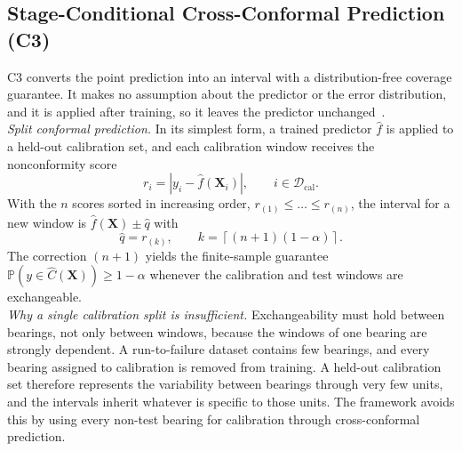 \subsection{Stage-Conditional Cross-Conformal Prediction (C3)}
\label{sec:c3_conformal}

C3 converts the point prediction into an interval with a
distribution-free coverage guarantee. It makes no assumption about the
predictor or the error distribution, and it is applied after training,
so it leaves the predictor unchanged~\cite{lei2018distribution,
angelopoulos2023gentle}.\\

\textit{Split conformal prediction.} In its simplest form, a trained
predictor $\hat{f}$ is applied to a held-out calibration set, and each
calibration window receives the nonconformity score
\begin{equation}
  r_i = \left| y_i - \hat{f}(\mathbf{X}_i) \right|,
  \qquad i \in \mathcal{D}_{\mathrm{cal}} .
  \label{eq:score}
\end{equation}
With the $n$ scores sorted in increasing order,
$r_{(1)} \leq \dots \leq r_{(n)}$, the interval for a new window is
$\hat{f}(\mathbf{X}) \pm \hat{q}$ with
\begin{equation}
  \hat{q} = r_{(k)}, \qquad
  k = \left\lceil (n+1)(1-\alpha) \right\rceil .
  \label{eq:quantile}
\end{equation}
The correction $(n+1)$ yields the finite-sample guarantee
$\mathbb{P}(y \in \hat{C}(\mathbf{X})) \geq 1 - \alpha$ whenever the
calibration and test windows are exchangeable.\\

\textit{Why a single calibration split is insufficient.} Exchangeability
must hold between bearings, not only between windows, because the
windows of one bearing are strongly dependent. A run-to-failure dataset
contains few bearings, and every bearing assigned to calibration is
removed from training. A held-out calibration set therefore represents
the variability between bearings through very few units, and the
intervals inherit whatever is specific to those units. The framework
avoids this by using every non-test bearing for calibration through
cross-conformal prediction.\\

